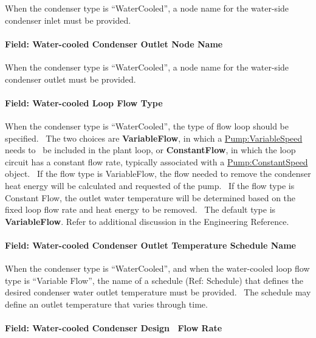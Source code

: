 When the condenser type is ``WaterCooled'', a node name for the water-side condenser inlet must be provided.

\paragraph{Field: Water-cooled Condenser Outlet Node Name}\label{field-water-cooled-condenser-outlet-node-name}

When the condenser type is ``WaterCooled'', a node name for the water-side condenser outlet must be provided.

\paragraph{Field: Water-cooled Loop Flow Type}\label{field-water-cooled-loop-flow-type}

When the condenser type is ``WaterCooled'', the type of flow loop should be specified.~ The two choices are \textbf{VariableFlow}, in which a \hyperref[pumpvariablespeed]{Pump:VariableSpeed} needs to~ be included in the plant loop, or \textbf{ConstantFlow}, in which the loop circuit has a constant flow rate, typically associated with a \hyperref[pumpconstantspeed]{Pump:ConstantSpeed} object.~ If the flow type is VariableFlow, the flow needed to remove the condenser heat energy will be calculated and requested of the pump.~ If the flow type is Constant Flow, the outlet water temperature will be determined based on the fixed loop flow rate and heat energy to be removed.~ The default type is \textbf{VariableFlow}. Refer to additional discussion in the Engineering Reference.

\paragraph{Field: Water-cooled Condenser Outlet Temperature Schedule Name}\label{field-water-cooled-condenser-outlet-temperature-schedule-name}

When the condenser type is ``WaterCooled'', and when the water-cooled loop flow type is ``Variable Flow'', the name of a schedule (Ref: Schedule) that defines the desired condenser water outlet temperature must be provided.~ The schedule may define an outlet temperature that varies through time.

\paragraph{Field: Water-cooled Condenser Design~ Flow Rate}\label{field-water-cooled-condenser-design-flow-rate}

